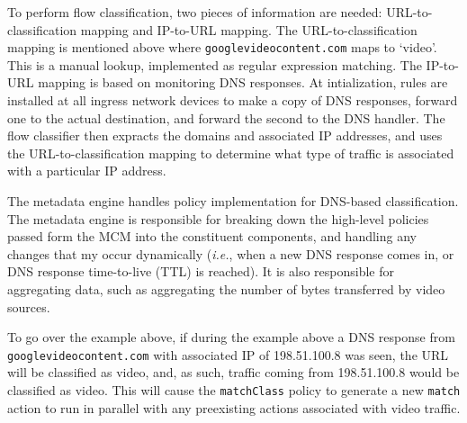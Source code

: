 \documentclass{sig-alternate}
\newcommand{\ie}{{\em i.e.}}
\newcommand\tti[1]{\small\texttt{#1}\normalsize}
\begin{document}
To perform flow classification, two pieces of information are needed: URL-to-classification mapping and IP-to-URL mapping. The URL-to-classification mapping is mentioned above where \tti{googlevideocontent.com} maps to `video'. This is a manual lookup, implemented as regular expression matching. The IP-to-URL mapping is based on monitoring DNS responses. At intialization, rules are installed at all ingress network devices to make a copy of DNS responses, forward one to the actual destination, and forward the second to the DNS handler. The flow classifier then expracts the domains and associated IP addresses, and uses the URL-to-classification mapping to determine what type of traffic is associated with a particular IP address. 


The metadata engine handles policy implementation for DNS-based classification. The metadata engine is responsible for breaking down the high-level policies passed form the MCM into the constituent components, and handling any changes that my occur dynamically (\ie{}, when a new DNS response comes in, or DNS response time-to-live (TTL) is reached). It is also responsible for aggregating data, such as aggregating the number of bytes transferred by video sources.

To go over the example above, if during the example above a DNS response from \tti{googlevideocontent.com} with associated IP of 198.51.100.8 was seen, the URL will be classified as video, and, as such, traffic coming from 198.51.100.8 would be classified as video. This will cause the \tti{matchClass} policy to generate a new \tti{match} action to run in parallel with any preexisting actions associated with video traffic. 
\end{document}
